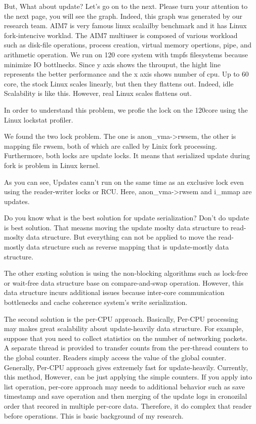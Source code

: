 But, What about update? Let's go on to the next.
Please turn your attention to the next page, you will see the graph.
Indeed, this graph was generated by our research team.
AIM7 is very famous linux scalailby benchmark and it has Linux fork-intencive
worklad.
The AIM7 multiuser is composed of various workload such as disk-file operations,
process creation, virtual memory opertions, pipe, and arithmetic operation.
We run on 120 core system with tmpfs filesystems because minimize IO bottlnecks.
Since y axis shows the throuput, the hight line represents the better
performance and the x axis shows number of cpu.
Up to 60 core, the stock Linux scales linearly, but then they flattens out.
Indeed, idle Scalability is like this.
However, real Linux scales flattens out.

In order to understand this problem, we profie the lock on the 120core using the
Linux lockstat profiler.

We found the two lock problem. The one is anon_vma->rwsem, the other is mapping
file rwsem, both of which are called by Linix fork processing.
Furthermore, both locks are update locks.
It means that serialized update during fork is problem in Linux kernel.

As you can see, Updates cann't run on the same time as an exclusive lock even
using the reader-writer locks or RCU.
Here, anon_vma->rwsem and i_mmap are updates.

Do you know what is the best solution for update serialization?
Don't do update is best solution.
That measns moving the update moslty data structure to read-moslty data
structure.
But everything can not be applied to move the read-mostly data structure 
such as reverse mapping that is update-mostly data structure.

The other exsting solution is using the non-blocking algorithms such as
lock-free or wait-free data structure base on compare-and-swap operation.
However, this data structure incurs additional issues because
inter-core communication bottlenecks and cache coherence system's write
serialization.

The second solution is the per-CPU approach.
Basically, Per-CPU processing may makes great scalability about update-heavily
data structure.
For example, suppose that you need to collect statistics on the number of
networking packets.
A separate thread is provided to transfer counts from the per-thread counters
to the global counter.
Readers simply access the value of the global counter.
Generally, Per-CPU approach gives extremely fast for update-heavily.
Currently, this method, However, can be just applying the simple counters.
If you apply into list operation, per-core approach may needs to additional
behavior such as save timestamp and save operation and then merging of the
update logs in cronozilal order that recored in multiple per-core data. 
Therefore, it do complex that reader before operations. 
This is basic background of my research.

